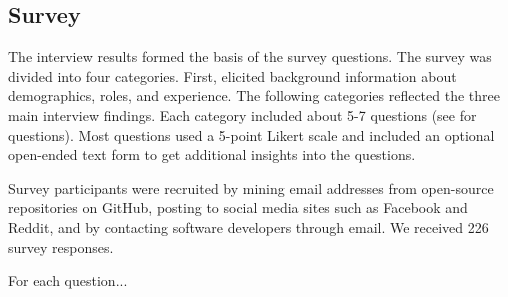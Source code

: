 
\subsection{Survey}

The interview results formed the basis of the survey questions. The survey was divided into four categories. First, elicited background information about demographics, roles, and experience. The following categories reflected the three main interview findings. Each category included about 5-7 questions (see \cite{companion_site} for questions). Most questions used a 5-point Likert scale and included an optional open-ended text form to get additional insights into the questions. 

Survey participants were recruited by mining email addresses from open-source repositories on GitHub, posting to social media sites such as Facebook and Reddit, and by contacting software developers through email. We received 226 survey responses.

For each question...